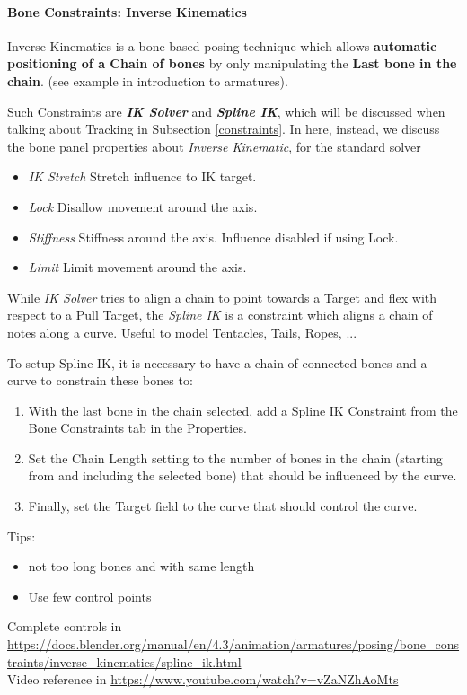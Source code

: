 \documentclass{article}
\begin{document}
\paragraph{Bone Constraints: Inverse Kinematics}
Inverse Kinematics is a bone-based posing technique which allows \textbf{automatic positioning of a Chain of bones} by only manipulating the \textbf{Last bone in the chain}. (see example in introduction to armatures).\par
Such Constraints are \textit{\textbf{IK Solver}} and \textit{\textbf{Spline IK}}, which will be discussed when talking about Tracking in Subsection \ref{constraints}. In here, instead, we discuss the 
bone panel properties about \textit{Inverse Kinematic}, for the standard solver
\begin{itemize}[topsep=0pt, noitemsep]
    \item \textit{IK Stretch} Stretch influence to IK target.
    \item \textit{Lock} Disallow movement around the axis.
    \item \textit{Stiffness} Stiffness around the axis. Influence disabled if using Lock.
    \item \textit{Limit} Limit movement around the axis.
\end{itemize}
While \textit{IK Solver} tries to align a chain to point towards a Target and flex with respect to a Pull Target, the \textit{Spline IK} is a constraint which aligns  a chain of notes along a curve.
Useful to model Tentacles, Tails, Ropes, ...\par
To setup Spline IK, it is necessary to have a chain of connected bones and a curve to constrain these bones to:
\begin{enumerate}[topsep=0pt, noitemsep]
    \item With the last bone in the chain selected, add a Spline IK Constraint from the Bone Constraints tab in the Properties.
    \item Set the Chain Length setting to the number of bones in the chain (starting from and including the selected bone) that should be influenced by the curve.
    \item Finally, set the Target field to the curve that should control the curve.
\end{enumerate}
Tips:
\begin{itemize}[noitemsep, topsep=0pt]
    \item not too long bones and with same length
    \item Use few control points
\end{itemize}
Complete controls in \url{https://docs.blender.org/manual/en/4.3/animation/armatures/posing/bone_constraints/inverse_kinematics/spline_ik.html}\\
Video reference in \url{https://www.youtube.com/watch?v=vZaNZhAoMts}
\end{document}
